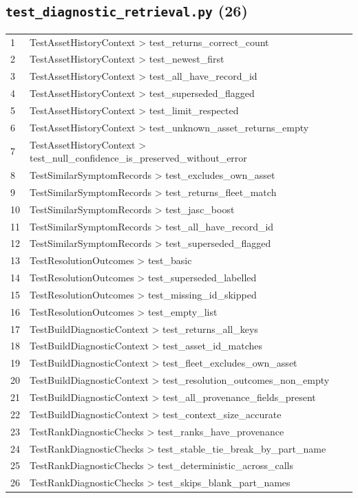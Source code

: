\subsection*{\texttt{test\_diagnostic\_retrieval.py} (26)}
\begin{longtable}{p{}p{}}
1 & TestAssetHistoryContext > test\_returns\_correct\_count \\
2 & TestAssetHistoryContext > test\_newest\_first \\
3 & TestAssetHistoryContext > test\_all\_have\_record\_id \\
4 & TestAssetHistoryContext > test\_superseded\_flagged \\
5 & TestAssetHistoryContext > test\_limit\_respected \\
6 & TestAssetHistoryContext > test\_unknown\_asset\_returns\_empty \\
7 & TestAssetHistoryContext > test\_null\_confidence\_is\_preserved\_without\_error \\
8 & TestSimilarSymptomRecords > test\_excludes\_own\_asset \\
9 & TestSimilarSymptomRecords > test\_returns\_fleet\_match \\
10 & TestSimilarSymptomRecords > test\_jasc\_boost \\
11 & TestSimilarSymptomRecords > test\_all\_have\_record\_id \\
12 & TestSimilarSymptomRecords > test\_superseded\_flagged \\
13 & TestResolutionOutcomes > test\_basic \\
14 & TestResolutionOutcomes > test\_superseded\_labelled \\
15 & TestResolutionOutcomes > test\_missing\_id\_skipped \\
16 & TestResolutionOutcomes > test\_empty\_list \\
17 & TestBuildDiagnosticContext > test\_returns\_all\_keys \\
18 & TestBuildDiagnosticContext > test\_asset\_id\_matches \\
19 & TestBuildDiagnosticContext > test\_fleet\_excludes\_own\_asset \\
20 & TestBuildDiagnosticContext > test\_resolution\_outcomes\_non\_empty \\
21 & TestBuildDiagnosticContext > test\_all\_provenance\_fields\_present \\
22 & TestBuildDiagnosticContext > test\_context\_size\_accurate \\
23 & TestRankDiagnosticChecks > test\_ranks\_have\_provenance \\
24 & TestRankDiagnosticChecks > test\_stable\_tie\_break\_by\_part\_name \\
25 & TestRankDiagnosticChecks > test\_deterministic\_across\_calls \\
26 & TestRankDiagnosticChecks > test\_skips\_blank\_part\_names \\
\end{longtable}
